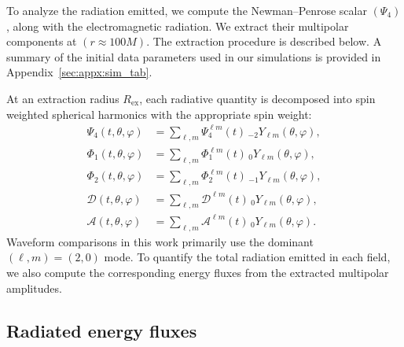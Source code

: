 To analyze the radiation emitted, we compute the Newman--Penrose scalar
$(\Psi_4)$, along with the electromagnetic radiation. We extract their multipolar components at $(r \approx 100M)$. The extraction procedure is described below. A summary of the initial data parameters used in our simulations is provided in Appendix~\ref{sec:appx:sim_tab}.

At an extraction radius $R_{\mathrm{ex}}$, each radiative quantity is decomposed into spin weighted spherical harmonics with the appropriate spin weight:
\begin{align}
    \Psi_4(t,\theta,\varphi)
    &=
    \sum_{\ell,m}
    \Psi_4^{\ell m}(t)\,
    {}_{-2}Y_{\ell m}(\theta,\varphi),
    \label{eq:app waveex psi4-decomp}
    \\
    \Phi_1(t,\theta,\varphi)
    &=
    \sum_{\ell,m}
    \Phi_1^{\ell m}(t)\,
    {}_{0}Y_{\ell m}(\theta,\varphi),
    \label{eq:app waveex phi1-decomp}
    \\
    \Phi_2(t,\theta,\varphi)
    &=
    \sum_{\ell,m}
    \Phi_2^{\ell m}(t)\,
    {}_{-1}Y_{\ell m}(\theta,\varphi),
    \label{eq:app waveex phi2-decomp}
    \\
    \mathcal{D}(t,\theta,\varphi)
    &=
    \sum_{\ell,m}
    \mathcal{D}^{\ell m}(t)\,
    {}_{0}Y_{\ell m}(\theta,\varphi),
    \label{eq:app waveex dilaton decomp}
    \\
    \mathcal{A}(t,\theta,\varphi)
    &=
    \sum_{\ell,m}
    \mathcal{A}^{\ell m}(t)\,
    {}_{0}Y_{\ell m}(\theta,\varphi).
    \label{eq:app waveex axion decomp}
\end{align}
Waveform comparisons in this work primarily use the dominant $(\ell,m)=(2,0)$ mode.
To quantify the total radiation emitted in each field, we also compute the corresponding energy fluxes from the extracted multipolar amplitudes.
\subsection{Radiated energy fluxes}

